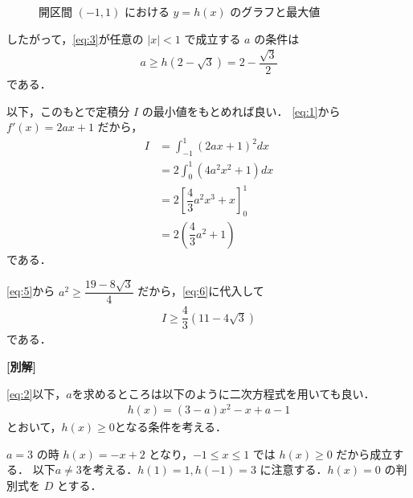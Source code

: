 \documentclass[../../main.tex]{subfiles}
\begin{document}
\begin{figure}[htb]
  \caption{開区間 $(-1, 1)$ における $y = h(x)$ のグラフと最大値}
  \label{fig:hx_rational_function_graph}
\end{figure}

したがって，\cref{eq:3}が任意の $|x|<1$ で成立する $a$ の条件は
\begin{align}
  a \ge h(2-\sqrt{3}) = 2-\dfrac{\sqrt{3}}{2} \label{eq:5}
\end{align}
である．

以下，このもとで定積分 $I$ の最小値をもとめれば良い．
\cref{eq:1}から$f'(x) = 2ax+1$ だから，
\begin{align}
  I
  &= \int_{-1}^1 (2ax+1)^2 dx \\
  &= 2 \int_0^1 (4a^2 x^2 + 1) dx \\
  &= 2 \left[ \dfrac{4}{3}a^2 x^3 + x \right]_0^1 \\
  &= 2 \left( \dfrac{4}{3}a^2 + 1 \right) \label{eq:6}
\end{align}
である．

\cref{eq:5}から $a^2 \ge \dfrac{19-8\sqrt{3}}{4}$ だから，\cref{eq:6}に代入して
\begin{align}
  I \ge \dfrac{4}{3}(11-4\sqrt{3})
\end{align}
である．

{\bf [別解]}

\cref{eq:2}以下，$a$を求めるところは以下のように二次方程式を用いても良い．
\begin{align}
  h(x) = (3-a)x^2 - x + a - 1 \label{eq:7}
\end{align}
とおいて，$h(x) \ge 0$となる条件を考える．

$a=3$ の時 $h(x) = -x + 2$ となり，$-1 \le x \le 1$ では $h(x) \ge 0$ だから成立する．
以下$a\neq 3$を考える．$h(1) = 1, h(-1) = 3$ に注意する．$h(x) = 0$ の判別式を $D$ とする．
\end{document}
